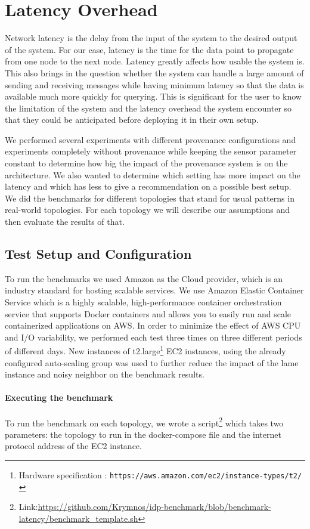 \section{Latency Overhead}

Network latency is the delay from the input of the system to the desired output of the system. For our case, latency is the time for the data point to propagate from one node to the next node. Latency greatly affects how usable the system is. This also brings in the question whether the system can handle a large amount of sending and receiving messages while having minimum latency so that the data is available much more quickly for querying. 
This is significant for the user to know the limitation of the system and the latency overhead the system encounter so that they could be anticipated before deploying it in their own setup.

We performed several experiments with different provenance configurations and experiments completely without provenance while keeping the sensor parameter constant to determine how big the impact of the provenance system is on the architecture. We also wanted to determine which setting has more impact on the latency and which has less to give a recommendation on a possible best setup. We did the benchmarks for different topologies that stand for usual patterns in real-world topologies. For each topology we will describe our assumptions and then evaluate the results of that.

\subsection{Test Setup and Configuration} \label{testsetup}
To run the benchmarks we used Amazon as the Cloud provider, which is an industry standard for hosting scalable services. We use Amazon Elastic Container Service which is a highly scalable, high-performance container orchestration service that supports Docker containers and allows you to easily run and scale containerized applications on AWS. In order to minimize the effect of AWS CPU and I/O variability, we performed each test three times on three different periods of different days.  New instances of t2.large\footnote{Hardware specification : \texttt{https://aws.amazon.com/ec2/instance-types/t2/} } EC2 instances, using the already configured auto-scaling group  was used to further reduce the impact of the lame instance and noisy neighbor on the benchmark results. 

\paragraph*{Executing the benchmark}
To run the benchmark on each topology, we wrote a script\footnote{Link:\url{https://github.com/Krymnos/idp-benchmark/blob/benchmark-latency/benchmark_template.sh} } which takes two parameters: the topology to run in the docker-compose file and the internet protocol address of the EC2 instance.

